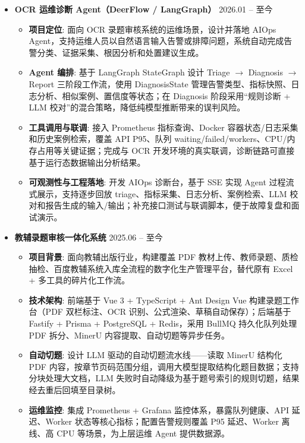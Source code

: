 \documentclass[zh]{resume}
\begin{document}
\begin{itemize}
  \item \textbf{OCR 运维诊断 Agent（DeerFlow / LangGraph）} \hfill 2026.01 -- 至今
  \begin{itemize}
    \item \textbf{项目定位}: 面向 OCR 录题审核系统的运维场景，设计并落地 AIOps Agent，支持运维人员以自然语言输入告警或排障问题，系统自动完成告警分类、证据采集、根因分析和处置建议生成。
    \item \textbf{Agent 编排}: 基于 LangGraph StateGraph 设计 Triage $\rightarrow$ Diagnosis $\rightarrow$ Report 三阶段工作流，使用 DiagnosisState 管理告警类型、指标快照、日志分析、相似案例、置信度等状态；在 Diagnosis 阶段采用“规则诊断 + LLM 校对”的混合策略，降低纯模型推断带来的误判风险。
    \item \textbf{工具调用与联调}: 接入 Prometheus 指标查询、Docker 容器状态/日志采集和历史案例检索，覆盖 API P95、队列 waiting/failed/workers、CPU/内存占用等关键证据；完成与 OCR 开发环境的真实联调，诊断链路可直接基于运行态数据输出分析结果。
    \item \textbf{可观测性与工程落地}: 开发 AIOps 诊断台，基于 SSE 实现 Agent 过程流式展示，支持逐步回放 triage、指标采集、日志分析、案例检索、LLM 校对和报告生成的输入/输出；补充接口测试与联调脚本，便于故障复盘和面试演示。
  \end{itemize}

  \item \textbf{教辅录题审核一体化系统} \hfill 2025.06 -- 至今
  \begin{itemize}
    \item \textbf{项目背景}: 面向教辅出版行业，构建覆盖 PDF 教材上传、教师录题、质检抽检、百度教辅系统入库全流程的数字化生产管理平台，替代原有 Excel + 多工具的碎片化工作流。
    \item \textbf{技术架构}: 前端基于 Vue 3 + TypeScript + Ant Design Vue 构建录题工作台（PDF 双栏标注、OCR 识别、公式渲染、草稿自动保存）；后端基于 Fastify + Prisma + PostgreSQL + Redis，采用 BullMQ 持久化队列处理 PDF 拆分、MinerU 内容提取、自动切题等异步任务。
    \item \textbf{自动切题}: 设计 LLM 驱动的自动切题流水线——读取 MinerU 结构化 PDF 内容，按章节页码范围分组，调用大模型提取结构化题目数据；支持分块处理大文档，LLM 失败时自动降级为基于题号索引的规则切题，结果经去重后回填至目录树。
    \item \textbf{运维监控}: 集成 Prometheus + Grafana 监控体系，暴露队列健康、API 延迟、Worker 状态等核心指标；配置告警规则覆盖 P95 延迟、Worker 离线、高 CPU 等场景，为上层运维 Agent 提供数据源。
  \end{itemize}
\end{itemize}
\end{document}
